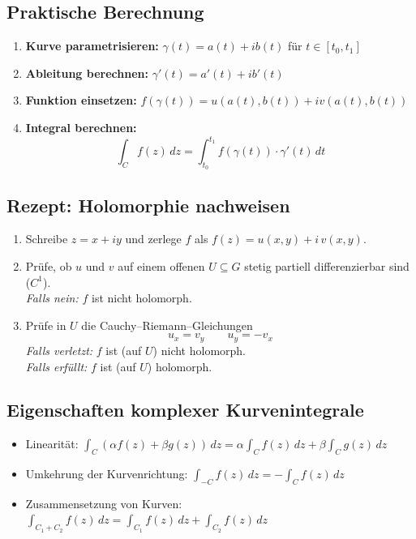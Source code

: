 \documentclass[a4paper,11pt,oneside,open=any,parskip=half, DIV=15]{scrreprt}
\begin{document}
   \subsection*{Praktische Berechnung}
      \begin{enumerate}
         \item \textbf{Kurve parametrisieren:} \( \gamma(t) = a(t) + ib(t) \) für \( t \in [t_0, t_1] \)
         \item \textbf{Ableitung berechnen:} \( \gamma'(t) = a'(t) + ib'(t) \)
         \item \textbf{Funktion einsetzen:} \( f(\gamma(t)) = u(a(t), b(t)) + iv(a(t), b(t)) \)
         \item \textbf{Integral berechnen:}
         \[
            \int_C f(z) \, dz = \int_{t_0}^{t_1} f(\gamma(t)) \cdot \gamma'(t) \, dt
         \]
      \end{enumerate}

   \subsection*{Rezept: Holomorphie nachweisen}
      \begin{enumerate}[leftmargin=1.2em]
         \item Schreibe \(z=x+iy\) und zerlege \(f\) als \(f(z)=u(x,y)+i\,v(x,y)\).
         \item Prüfe, ob \(u\) und \(v\) auf einem offenen \(U\subseteq G\) stetig partiell differenzierbar sind (\(C^{1}\)).\\
               \emph{Falls nein:} \(f\) ist nicht holomorph.
         \item Prüfe in \(U\) die Cauchy–Riemann–Gleichungen
               \[
                  u_x=v_y \qquad u_y=-v_x
               \]
               \emph{Falls verletzt:} \(f\) ist (auf \(U\)) nicht holomorph.\\
               \emph{Falls erfüllt:} \(f\) ist (auf \(U\)) holomorph.
      \end{enumerate}

   \subsection*{Eigenschaften komplexer Kurvenintegrale}
      \begin{itemize}
         \item Linearität: \( \int_C (\alpha f(z) + \beta g(z)) \, dz = \alpha \int_C f(z) \, dz + \beta \int_C g(z) \, dz \)
         \item Umkehrung der Kurvenrichtung: \( \int_{-C} f(z) \, dz = -\int_C f(z) \, dz \)
         \item Zusammensetzung von Kurven: \( \int_{C_1 + C_2} f(z) \, dz = \int_{C_1} f(z) \, dz + \int_{C_2} f(z) \, dz \)
      \end{itemize}
\end{document}
